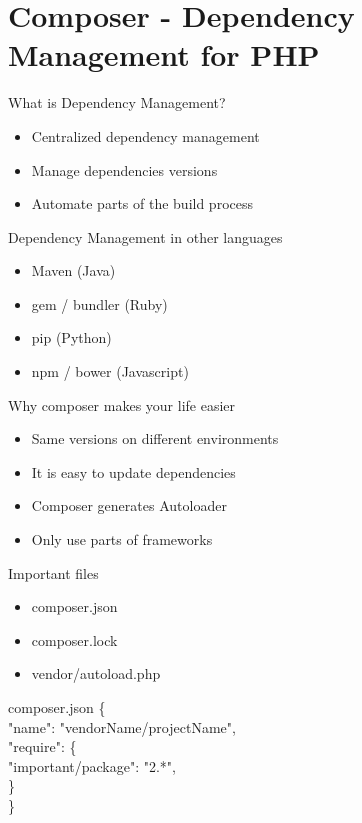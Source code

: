 \section{Composer - Dependency Management for PHP}

\begin{frame}{What is Dependency Management?}
	\begin{itemize}
		\item Centralized dependency management
		\item Manage dependencies versions
		\item Automate parts of the build process
	\end{itemize}
\end{frame}

\begin{frame}{Dependency Management in other languages}
	\begin{itemize}
		\item Maven (Java)
		\item gem / bundler (Ruby)
		\item pip (Python)
		\item npm / bower (Javascript)
	\end{itemize}
\end{frame}

\begin{frame}{Why composer makes your life easier}
	\begin{itemize}
		\item Same versions on different environments
		\item It is easy to update dependencies
		\item Composer generates Autoloader
		\item Only use parts of frameworks
	\end{itemize}
\end{frame}


\begin{frame}{Important files}
	\begin{itemize}
		\item composer.json
		\item composer.lock
		\item vendor/autoload.php
	\end{itemize}
\end{frame}

\begin{frame}{composer.json}
	\{ ~\\
		\hspace{1cm}"name": "vendorName/projectName", ~\\
		\hspace{1cm}"require": \{ ~\\
		\hspace{2cm}"important/package": "2.*", ~\\
		\hspace{1cm}\} ~\\
	\} ~\\
\end{frame}


